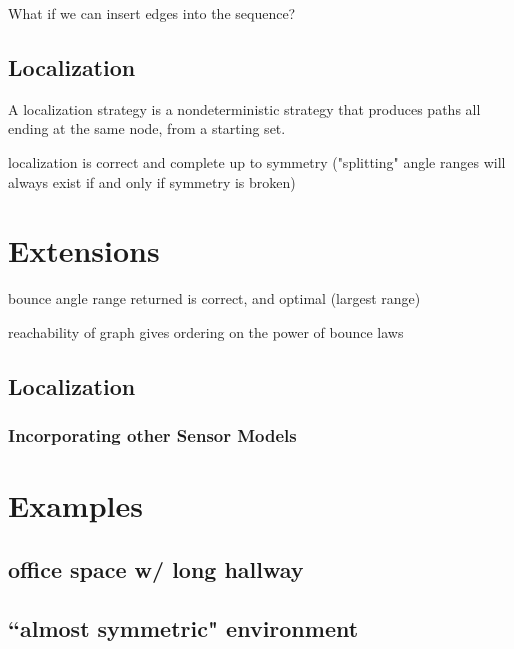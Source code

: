 \documentclass[]{styles/svproc}  %
\begin{document}
What if we can insert edges into the sequence?

\subsection{Localization}

\begin{definition}
A localization strategy is a nondeterministic strategy that produces paths all
ending at the same node, from a starting set.
\end{definition}

\begin{theorem}
localization is correct and complete up to symmetry ("splitting" angle ranges
will always exist if and only if symmetry is broken)
\end{theorem}


\section{Extensions}

\begin{corollary} bounce angle range returned is correct, and optimal
   (largest range)
\end{corollary}

\begin{theorem}
reachability of graph gives ordering on the power of bounce laws
\end{theorem}

\subsection{Localization}

\subsubsection{Incorporating other Sensor Models}

\section{Examples}

\subsection{office space w/ long hallway}
\subsection{``almost symmetric" environment}
\end{document}
